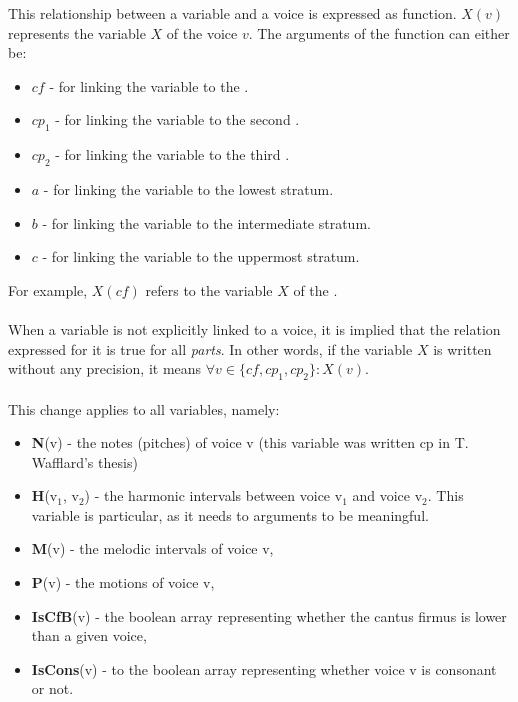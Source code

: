 This relationship between a variable and a voice is expressed as function. $X(v)$ represents the variable $X$ of the voice $v$. The arguments of the function can either be:
\begin{itemize}
    \item $cf$ - for linking the variable to the \cf.
    \item $cp_1$ - for linking the variable to the second \cp.
    \item $cp_2$ - for linking the variable to the third \cp.
    \item $a$ - for linking the variable to the lowest stratum.
    \item $b$ - for linking the variable to the intermediate stratum.
    \item $c$ - for linking the variable to the uppermost stratum.
  \end{itemize}

\noindent For example, $X(cf)$ refers to the variable $X$ of the \cf.

\paragraph{}
When a variable is not explicitly linked to a voice, it is implied that the relation expressed for it is true for all \textit{parts}. In other words, if the variable $X$ is written without any precision, it means $\forall v \in \{cf, cp_1, cp_2\}: X(v)$.

\paragraph{}
\noindent This change applies to all variables, namely:
\begin{itemize}
    \item \textbf{N}(v) - the notes (pitches) of voice v (this variable was written cp in T. Wafflard's thesis)
    \item \textbf{H}(v$_1$, v$_2$) - the harmonic intervals between voice v$_1$ and voice v$_2$. This variable is particular, as it needs to arguments to be meaningful.
    \item \textbf{M}(v) - the melodic intervals of voice v, 
    \item \textbf{P}(v) - the motions of voice v, 
    \item \textbf{IsCfB}(v) - the boolean array representing whether the cantus firmus is lower than a given voice,
    \item \textbf{IsCons}(v) - to the boolean array representing whether voice v is consonant or not.
\end{itemize}


